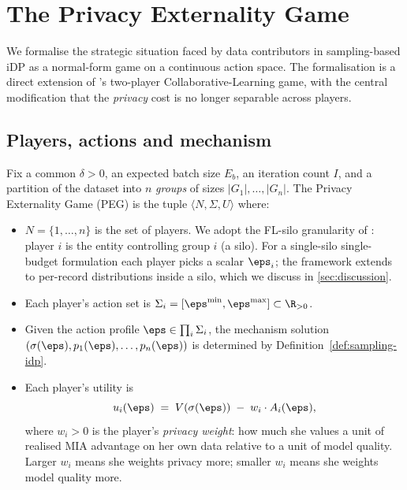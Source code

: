 \section{The Privacy Externality Game}
\label{sec:game}

We formalise the strategic situation faced by data contributors in
sampling-based iDP as a normal-form game on a continuous action space. The
formalisation is a direct extension of \citet{pejo2019together}'s two-player
Collaborative-Learning game, with the central modification that the
\emph{privacy} cost is no longer separable across players.

\subsection{Players, actions and mechanism}

\begin{definition}
\label{def:peg}
Fix a common $\delta>0$, an expected batch size $E_b$, an iteration count $I$,
and a partition of the dataset into $n$ \emph{groups} of sizes
$|G_1|,\dots,|G_n|$. The Privacy Externality Game (PEG) is the tuple
$\langle N, \Sigma, U\rangle$ where:
\begin{itemize}
\item $N = \{1,\dots,n\}$ is the set of players. We adopt the FL-silo
  granularity of \cite{kaiser2026your}: player $i$ is the entity controlling
  group $i$ (a silo). For a single-silo single-budget formulation each
  player picks a scalar $\eps_i$; the framework extends to per-record
  distributions inside a silo, which we discuss in
  \cref{sec:discussion}.
\item Each player's action set is $\Sigma_i = [\eps^{\min}, \eps^{\max}]
  \subset \R_{>0}$.
\item Given the action profile $\boldsymbol{\eps} \in \prod_i
  \Sigma_i$, the mechanism solution
  $(\sigma(\boldsymbol{\eps}), p_1(\boldsymbol{\eps}),\dots,
  p_n(\boldsymbol{\eps}))$ is determined by Definition~\ref{def:sampling-idp}.
\item Each player's utility is
  \begin{equation}
  u_i(\boldsymbol{\eps}) \;=\;
  V(\sigma(\boldsymbol{\eps}))
  \;-\;
  w_i\cdot A_i(\boldsymbol{\eps}),
  \label{eq:utility}
  \end{equation}
  where $w_i > 0$ is the player's \emph{privacy weight}: how much she
  values a unit of realised MIA advantage on her own data relative to a
  unit of model quality. Larger $w_i$ means she weights privacy more;
  smaller $w_i$ means she weights model quality more.
\end{itemize}
\end{definition}

